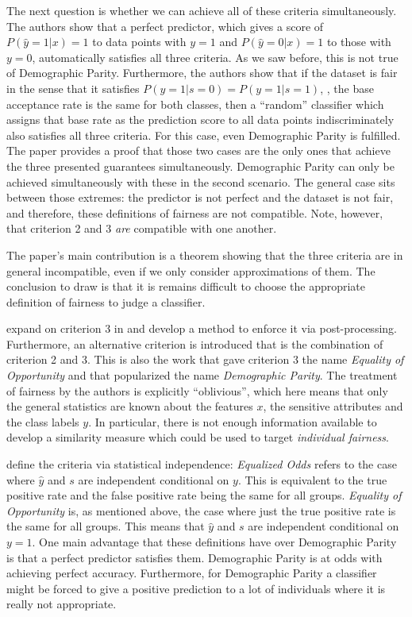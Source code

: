 The next question is whether we can achieve all of these criteria simultaneously.
The authors show that a perfect predictor,
which gives a score of \(P(\hat{y}=1|x) = 1\) to data points with \(y=1\)
and \(P(\hat{y}=0|x) = 1\) to those with \(y=0\),
automatically satisfies all three criteria.
As we saw before, this is not true of Demographic Parity.
Furthermore, the authors show that if the dataset is fair in the sense that it satisfies \(P(y=1|s=0) = P(y=1|s=1)\),
\ie, the base acceptance rate is the same for both classes,
then a ``random'' classifier which assigns that base rate as the prediction score to all data points indiscriminately
also satisfies all three criteria.
For this case, even Demographic Parity is fulfilled.
The paper provides a proof
that those two cases are the only ones that achieve the three presented guarantees simultaneously.
Demographic Parity can only be achieved simultaneously with these in the second scenario.
The general case sits between those extremes:
the predictor is not perfect and the dataset is not fair,
and therefore, these definitions of fairness are not compatible.
Note, however, that criterion 2 and 3 \emph{are} compatible with one another.

The paper's main contribution is a theorem showing that the three criteria are in general incompatible,
even if we only consider approximations of them.
The conclusion to draw is
that it is remains difficult to choose the appropriate definition of fairness to judge a classifier.

\citet{hardt2016equality} expand on criterion 3 in \citet{kleinberg2016inherent}
and develop a method to enforce it via post-processing.
Furthermore, an alternative criterion is introduced that is the combination of criterion 2 and 3.
This is also the work that gave criterion 3 the name \emph{Equality of Opportunity}
and that popularized the name \emph{Demographic Parity}.
The treatment of fairness by the authors is explicitly ``oblivious'',
which here means that only the general statistics are known
about the features \(x\), the sensitive attributes and the class labels \(y\).
In particular, there is not enough information available to develop a similarity measure
which could be used to target \emph{individual fairness}.

\citet{hardt2016equality} define the criteria via statistical independence:
\emph{Equalized Odds} refers to the case where \(\hat{y}\) and \(s\) are independent conditional on \(y\).
This is equivalent to the true positive rate and the false positive rate being the same for all groups.
\emph{Equality of Opportunity} is, as mentioned above,
the case where just the true positive rate is the same for all groups.
This means that \(\hat{y}\) and \(s\) are independent conditional on \(y=1\).
One main advantage that these definitions have over Demographic Parity is that a perfect predictor satisfies them.
Demographic Parity is at odds with achieving perfect accuracy.
Furthermore, for Demographic Parity a classifier might be forced to give a positive prediction to a lot of individuals
where it is really not appropriate.

